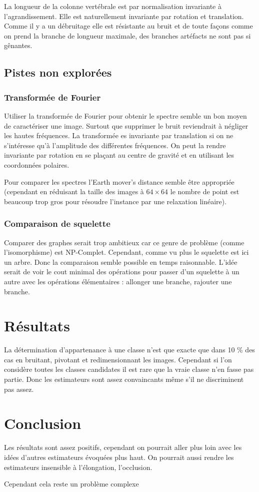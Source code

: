 \documentclass{article}
\theoremstyle{definition}
\begin{document}
      La longueur de la colonne vertébrale est par normalisation invariante à l'agrandissement. Elle est naturellement invariante par rotation et translation. Comme il y a un débruitage elle est résistante au bruit et de toute façons comme on prend la branche de longueur maximale, des branches artéfacts ne sont pas si gênantes.
    
    \subsection{Pistes non explorées}
        \subsubsection{Transformée de Fourier} 
        
        Utiliser la transformée de Fourier pour obtenir le spectre semble un bon moyen de caractériser une image. Surtout que supprimer le bruit reviendrait à négliger les hautes fréquences. La transformée es invariante par translation si on ne s'intéresse qu'à l'amplitude des différentes fréquences. On peut la rendre invariante par rotation en se plaçant au centre de gravité et en utilisant les coordonnées polaires.
        
        Pour comparer les spectres l'Earth mover's distance semble être appropriée (cependant en réduisant la taille des images à $64 \times 64$ le nombre de point est beaucoup trop gros pour résoudre l'instance par une relaxation linéaire).
        
        \subsubsection{Comparaison de squelette} 
        
        Comparer des graphes serait trop ambitieux car ce genre de problème (comme l'isomorphisme) est NP-Complet. Cependant, comme vu plus le squelette est ici un arbre. Donc la comparaison semble possible en temps raisonnable. L'idée serait de voir le cout minimal des opérations pour passer d'un squelette à un autre avec les opérations élémentaires : allonger une branche, rajouter une branche.
  
  \section{Résultats} 

    La détermination d'appartenance à une classe n'est que exacte que dans 10 \% des cas en bruitant, pivotant et redimensionnant les images. Cependant si l'on considère toutes les classes candidates il est rare que la vraie classe n'en fasse pas partie. Donc les estimateurs sont assez convaincants même s'il ne discriminent pas assez.
  
  \section{Conclusion}
  
  Les résultats sont assez positifs, cependant on pourrait aller plus loin avec les idées d'autres estimateurs évoquées plus haut. On pourrait aussi rendre les estimateurs insensible à l'élongation, l'occlusion.
  
	Cependant cela reste un problème complexe
\end{document}
